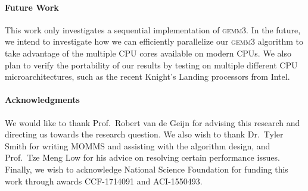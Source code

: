 \documentclass[12pt]{article}
\newcommand*{\gemmt}{{\textsc{gemm3}}}
\begin{document}
\paragraph{Future Work} This work only investigates a sequential implementation of \gemmt{}.
In the future, we intend to investigate how we can efficiently parallelize our \gemmt{} algorithm to take advantage of the multiple CPU cores available on modern CPUs.
We also plan to verify the portability of our results by testing on multiple different CPU microarchitectures, such as the recent Knight's Landing processors from Intel.

\paragraph{Acknowledgments}
We would like to thank Prof.\ Robert van de Geijn for advising this research and directing us towards the research question.
We also wish to thank Dr.\ Tyler Smith for writing MOMMS and assisting with the algorithm design, and Prof.\ Tze Meng Low for his advice on resolving certain performance issues.
Finally, we wish to acknowledge National Science Foundation for funding this work through awards CCF-1714091 and ACI-1550493.
\printbibliography{}
\end{document}
